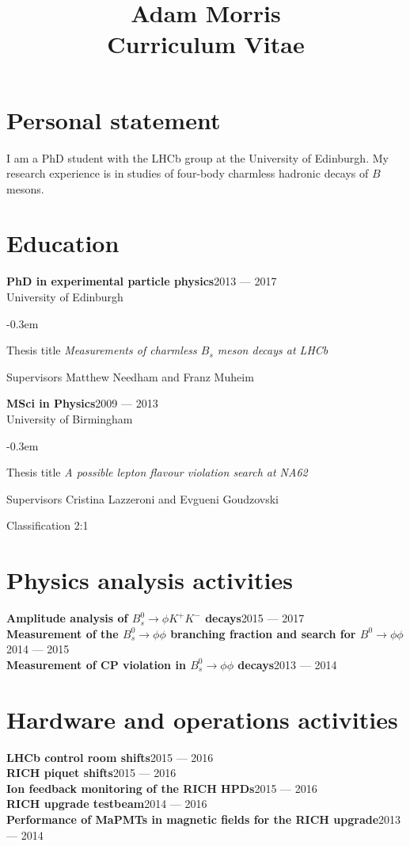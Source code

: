 \documentclass{simplecv}
\title{Adam Morris\\{\large Curriculum Vitae}}
\newcommand\dateditem[2]{#1\hfill#2\\}
\newcommand\topictitle[3]{\dateditem{{\textbf{#1}}}{#3}#2}
\def\typeface{phv}
\begin{document}
	\maketitle
	\fontfamily{\typeface}\selectfont
	\section{Personal statement}
	I am a PhD student with the LHCb group at the University of Edinburgh.
	My research experience is in studies of four-body charmless hadronic decays of $B$ mesons.
	\section{Education}
	\topictitle{PhD in experimental particle physics}{University of Edinburgh}{2013 --- 2017}
	\begin{topic}
		\itemsep-0.3em
		\item[Thesis title]{\textit{Measurements of charmless $B_s$ meson decays at LHCb}}
		\item[Supervisors]{Matthew Needham and Franz Muheim}
	\end{topic}
	\topictitle{MSci in Physics}{University of Birmingham}{2009 --- 2013}
	\begin{topic}
		\itemsep-0.3em
		\item[Thesis title]{\textit{A possible lepton flavour violation search at NA62}}
		\item[Supervisors]{Cristina Lazzeroni and Evgueni Goudzovski}
		\item[Classification]{2:1}
	\end{topic}
	\section{Physics analysis activities}
	\topictitle{Amplitude analysis of $B^0_s \to \phi K^{+}K^{-}$ decays}{}{2015 --- 2017}
	\topictitle{Measurement of the $B^0_s \to \phi\phi$ branching fraction and search for $B^0 \to \phi \phi$}{}{2014 --- 2015}
	\topictitle{Measurement of CP violation in $B^0_s \to \phi\phi$ decays}{}{2013 --- 2014}
	\section{Hardware and operations activities}
	\topictitle{LHCb control room shifts}{}{2015 --- 2016}
	\topictitle{RICH piquet shifts}{}{2015 --- 2016}
	\topictitle{Ion feedback monitoring of the RICH HPDs}{}{2015 --- 2016}
	\topictitle{RICH upgrade testbeam}{}{2014 --- 2016}
	\topictitle{Performance of MaPMTs in magnetic fields for the RICH upgrade}{}{2013 --- 2014}
\end{document}
